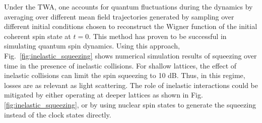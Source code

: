 \documentclass{nature}
\begin{document}
Under the TWA, one accounts for quantum fluctuations during the dynamics by  averaging over different mean field trajectories generated by sampling over different initial conditions chosen to reconstruct the Wigner function of the initial coherent spin state at $t=0$\cite{rey2014probing}.
This method has proven to be successful in simulating quantum spin dynamics.
Using this approach, Fig.~\ref{fig:inelastic_squeezing} shows numerical simulation results of squeezing over time in the presence of inelastic collisions.
For shallow lattices, the effect of inelastic collisions can limit the spin squeezing to 10 dB.
Thus, in this regime, losses are as relevant as light scattering.
The role of inelastic interactions could be mitigated by either operating at deeper lattices as shown in Fig. \ref{fig:inelastic_squeezing}, or by using nuclear spin states to generate the squeezing instead of the clock states directly.


\end{document}
